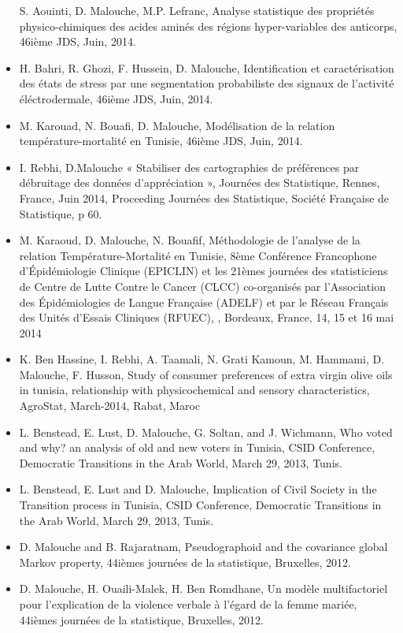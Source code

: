 \documentclass[]{article}
\begin{document}
\begin{itemize}
  S. Aouinti, D. Malouche, M.P. Lefranc, Analyse statistique des
  propriétés physico-chimiques des acides aminés des régions
  hyper-variables des anticorps, 46ième JDS, Juin, 2014.
\item
  H. Bahri, R. Ghozi, F. Hussein, D. Malouche, Identification et
  caractérisation des états de stress par une segmentation probabiliste
  des signaux de l'activité éléctrodermale, 46ième JDS, Juin, 2014.
\item
  M. Karouad, N. Bouafi, D. Malouche, Modélisation de la relation
  température-mortalité en Tunisie, 46ième JDS, Juin, 2014.
\item
  I. Rebhi, D.Malouche « Stabiliser des cartographies de préférences par
  débruitage des données d'appréciation », Journées des Statistique,
  Rennes, France, Juin 2014, Proceeding Journées des Statistique,
  Société Française de Statistique, p 60.
\item
  M. Karaoud, D. Malouche, N. Bouafif, Méthodologie de l'analyse de la
  relation Température-Mortalité en Tunisie, 8ème Conférence Francophone
  d'Épidémiologie Clinique (EPICLIN) et les 21èmes journées des
  statisticiens de Centre de Lutte Contre le Cancer (CLCC) co-organisés
  par l'Association des Épidémiologies de Langue Française (ADELF) et
  par le Réseau Français des Unités d'Essais Cliniques (RFUEC), ,
  Bordeaux, France, 14, 15 et 16 mai 2014
\item
  K. Ben Hassine, I. Rebhi, A. Taamali, N. Grati Kamoun, M. Hammami, D.
  Malouche, F. Husson, Study of consumer preferences of extra virgin
  olive oils in tunisia, relationship with physicochemical and sensory
  characteristics, AgroStat, March-2014, Rabat, Maroc
\item
  L. Benstead, E. Lust, D. Malouche, G. Soltan, and J. Wichmann, Who
  voted and why? an analysis of old and new voters in Tunisia, CSID
  Conference, Democratic Transitions in the Arab World, March 29, 2013,
  Tunis.
\item
  L. Benstead, E. Lust and D. Malouche, Implication of Civil Society in
  the Transition process in Tunisia, CSID Conference, Democratic
  Transitions in the Arab World, March 29, 2013, Tunis.
\item
  D. Malouche and B. Rajaratnam, Pseudographoid and the covariance
  global Markov property, 44ièmes journées de la statistique, Bruxelles,
  2012.
\item
  D. Malouche, H. Ouaili-Malek, H. Ben Romdhane, Un modèle
  multifactoriel pour l'explication de la violence verbale à l'égard de
  la femme mariée, 44ièmes journées de la statistique, Bruxelles, 2012.

\end{itemize}
\end{document}
